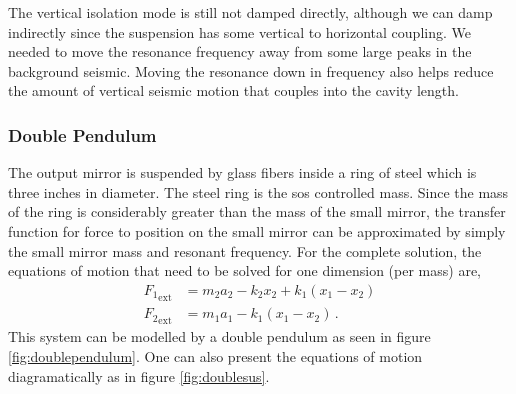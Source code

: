 The vertical isolation mode is still not damped directly,
although we can damp indirectly since the suspension has some vertical
to horizontal coupling.
We needed to move the resonance frequency away from some large peaks in
the background seismic.
Moving the resonance down in frequency also helps reduce the amount of
vertical seismic motion that couples into the cavity length.

\subsubsection{Double Pendulum}
\label{sec:doublepend}

The output mirror is suspended by glass fibers inside a ring of steel which is
three inches in diameter. The steel ring is the \ac{sos} controlled mass.
Since the mass of the ring is considerably greater than the mass of the small
mirror, the transfer function for force to position on the small mirror can be
approximated by simply the small mirror mass and resonant frequency.
For the complete solution, the equations of motion that need to be solved for
one dimension (per mass) are,
\begin{align}
{F_1}_{\mathrm{ext}} &= m_2a_2-k_2x_2+k_1\left(x_1-x_2\right) \\
{F_2}_{\mathrm{ext}} &= m_1a_1-k_1\left(x_1-x_2\right) \, .
\end{align}
This system can be modelled by a double pendulum as seen in figure
\ref{fig:doublependulum}.
One can also present the equations of motion diagramatically as in figure
\ref{fig:doublesus}.


